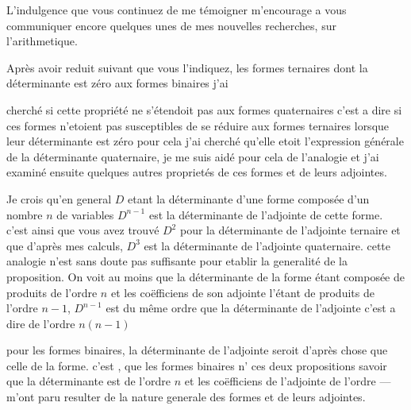 \documentclass[11pt,a4paper]{article}
\begin{document}

L'indulgence que vous continuez de me témoigner m'encourage a vous
communiquer encore quelques unes de mes nouvelles recherches, sur
l'arithmetique.

Après avoir reduit suivant que vous l'indiquez, les formes ternaires dont la
déterminante est zéro aux formes binaires j'ai

cherché si cette propriété ne s'étendoit pas aux formes quaternaires c'est a
dire si ces formes n'etoient pas susceptibles de se réduire aux formes
ternaires lorsque leur déterminante est zéro pour cela j'ai cherché qu'elle
etoit l'expression générale de la déterminante quaternaire, je me suis aidé
pour cela de l'analogie  et j'ai examiné  ensuite quelques autres proprietés de
ces formes et de leurs adjointes.


Je crois qu'en general $D$ etant la déterminante d'une forme composée d'un
nombre $n$ de variables $D^{n-1}$  est la déterminante de
l'adjointe de cette forme. c'est ainsi que vous avez trouvé $D^2$ pour la
déterminante de l'adjointe ternaire et  que d'après mes
calculs, $D^3$ est la déterminante de l'adjointe quaternaire. 
cette analogie n'est sans doute pas suffisante pour etablir la generalité de
la proposition. On voit au moins que la déterminante de la forme étant
composée de produits de l'ordre $n$ et les coëfficiens de son adjointe
l'étant de produits de l'ordre $n - 1$, $D^{n-1}$ est du même ordre que la
déterminante de l'adjointe c'est a dire de l'ordre $n(n - 1)$


pour les formes binaires, la déterminante de l'adjointe seroit d'après
 chose que celle de la forme. c'est
, que les formes  binaires n'
ces deux propositions savoir que  la déterminante est de
l'ordre  $n$ et les coëfficiens de l'adjointe de
l'ordre  — m'ont paru resulter de la nature generale des
formes et de leurs adjointes.
\end{document}
